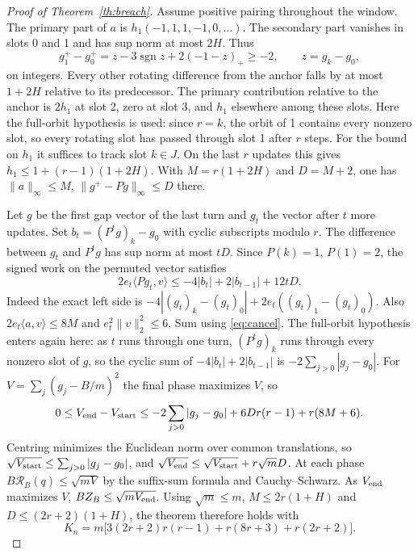 \documentclass[11pt,reqno]{amsart}
\theoremstyle{definition}
\newcommand{\sgn}{\operatorname{sgn}}
\begin{document}
\begin{proof}[Proof of Theorem~\ref{th:breach}]
Assume positive pairing throughout the window. The primary part of \(a\) is \(h_1(-1,1,1,-1,0,\ldots)\). The secondary part vanishes in slots 0 and 1 and has sup norm at most \(2H\). Thus
\[
  g_1^+-g_0^+=z-3\sgn z+2(-1-z)_+\ge-2,\qquad z=g_k-g_0,
\]
on integers. Every other rotating difference from the anchor falls by at most \(1+2H\) relative to its predecessor. The primary contribution relative to the anchor is \(2h_1\) at slot 2, zero at slot 3, and \(h_1\) elsewhere among these slots. Here the full-orbit hypothesis is used: since \(r=k\), the orbit of 1 contains every nonzero slot, so every rotating slot has passed through slot 1 after \(r\) steps. For the bound on \(h_1\) it suffices to track slot \(k\in J\). On the last \(r\) updates this gives \(h_1\le1+(r-1)(1+2H)\). With \(M=r(1+2H)\) and \(D=M+2\), one has \(\|a\|_\infty\le M\), \(\|g^+-Pg\|_\infty\le D\) there.

Let \(g\) be the first gap vector of the last turn and \(g_t\) the vector after \(t\) more updates. Set \(b_t=(P^tg)_k-g_0\) with cyclic subscripts modulo \(r\). The difference between \(g_t\) and \(P^tg\) has sup norm at most \(tD\). Since \(P(k)=1\), \(P(1)=2\), the signed work on the permuted vector satisfies
\[
 2e_t\langle Pg_t,v\rangle\le -4|b_t|+2|b_{t-1}|+12tD.
\]
Indeed the exact left side is \(-4|(g_t)_k-(g_t)_0|+2e_t((g_t)_1-(g_t)_0)\). Also \(2e_t\langle a,v\rangle\le8M\) and \(e_t^2\|v\|_2^2\le6\). Sum using \eqref{eq:cancel}. The full-orbit hypothesis enters again here: as \(t\) runs through one turn, \((P^tg)_k\) runs through every nonzero slot of \(g\), so the cyclic sum of \(-4|b_t|+2|b_{t-1}|\) is \(-2\sum_{j>0}|g_j-g_0|\). For \(V=\sum_j(g_j-B/m)^2\) the final phase maximizes \(V\), so
\[
 0\le V_{\rm end}-V_{\rm start}
 \le -2\sum_{j>0}|g_j-g_0|+6Dr(r-1)+r(8M+6).
\]
Centring minimizes the Euclidean norm over common translations, so \(\sqrt{V_{\rm start}}\le\sum_{j>0}|g_j-g_0|\), and \(\sqrt{V_{\rm end}}\le\sqrt{V_{\rm start}}+r\sqrt m D\). At each phase \(B\mathcal R_B(q)\le\sqrt{mV}\) by the suffix-sum formula and Cauchy--Schwarz. As \(V_{\rm end}\) maximizes \(V\), \(BZ_B\le\sqrt{mV_{\rm end}}\). Using \(\sqrt m\le m\), \(M\le2r(1+H)\) and \(D\le(2r+2)(1+H)\), the theorem therefore holds with
\[
 K_n=m\big[3(2r+2)r(r-1)+r(8r+3)+r(2r+2)\big].
\]
\end{proof}
\end{document}
